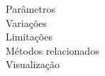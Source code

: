 \begin{description}
\item[Parâmetros]
\item[Variações]
\item[Limitações]
\item[Métodos relacionados]
\item[Visualização]
\end{description}
%
%
%
%
%
%
